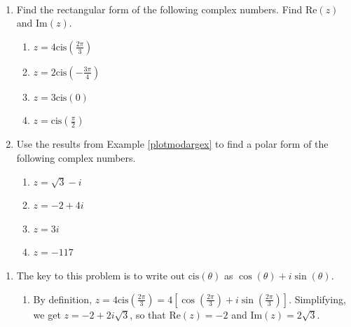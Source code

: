 \documentclass{ximera}
\begin{document}
\begin{example} \label{polarcomplexex} $~$

\begin{enumerate}

\item Find the rectangular form of the following complex numbers. Find $\text{Re}(z)$ and $\text{Im}(z)$.


\begin{enumerate}

\item  $z = 4 \text{cis}\left(\frac{2\pi}{3}\right)$

\item  $z = 2 \text{cis}\left(-\frac{3\pi}{4}\right)$

\item  $z = 3 \text{cis}(0)$

\item  $z = \text{cis}\left(\frac{\pi}{2}\right)$

\end{enumerate}


\item  Use the results from Example \ref{plotmodargex} to find a polar form of the following complex numbers.


\begin{enumerate}

\item  $z = \sqrt{3}-i$

\item  $z = -2+4i$

\item  $z = 3i$

\item  $z = -117$

\end{enumerate}


\end{enumerate}

\begin{explanation}

\begin{enumerate}


\item The key to this problem is to write out $\text{cis}(\theta)$ as $\cos(\theta) + i\sin(\theta)$.

\begin{enumerate}

\item By definition, $z =4 \text{cis}\left(\frac{2\pi}{3}\right) = 4\left[\cos\left(\frac{2\pi}{3}\right) + i \sin\left(\frac{2\pi}{3}\right)\right]$.  Simplifying, we get $z = -2 + 2i\sqrt{3}$, so that $\text{Re}(z) = -2$ and $\text{Im}(z) = 2\sqrt{3}$.


\end{enumerate}
\end{enumerate}
\end{explanation}
\end{example}
\end{document}
